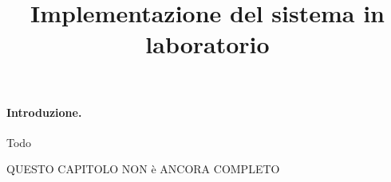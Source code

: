 \title{Implementazione del sistema in laboratorio}
\maketitle
\label{sec:pic-irl}


\paragraph{Introduzione.}
Todo

QUESTO CAPITOLO NON è ANCORA COMPLETO

\iffalse
Mostro poi il sistema reale che ho costruito e su cui si basa il modello.
Concludo illustrando un modo per ottenere alcuni parametri non misurabili
ditettamente.
\fi


